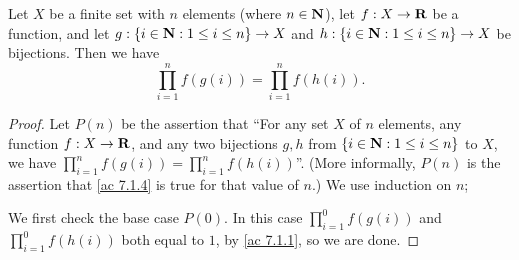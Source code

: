 \begin{additional corollary}\label{ac 7.1.4}
Let \(X\) be a finite set with \(n\) elements (where \(n \in \mathbf{N}\)), let \(f : X \to \mathbf{R}\) be a function, and let \(g : \{i \in \mathbf{N} : 1 \leq i \leq n\} \to X\) and \(h : \{i \in \mathbf{N} : 1 \leq i \leq n\} \to X\) be bijections.
Then we have
\[
  \prod_{i = 1}^n f(g(i)) = \prod_{i = 1}^n f(h(i)).
\]
\end{additional corollary}

\begin{proof}
  Let \(P(n)\) be the assertion that ``For any set \(X\) of \(n\) elements, any function \(f : X \to \mathbf{R}\), and any two bijections \(g, h\) from \(\{i \in \mathbf{N} : 1 \leq i \leq n\}\) to \(X\), we have \(\prod_{i = 1}^n f(g(i)) = \prod_{i = 1}^n f(h(i))\)''.
  (More informally, \(P(n)\) is the assertion that \cref{ac 7.1.4} is true for that value of \(n\).)
  We use induction on \(n\);

  We first check the base case \(P(0)\).
  In this case \(\prod_{i = 1}^0 f(g(i))\) and \(\prod_{i = 1}^0 f(h(i))\) both equal to \(1\), by \cref{ac 7.1.1}, so we are done.


\end{proof}
